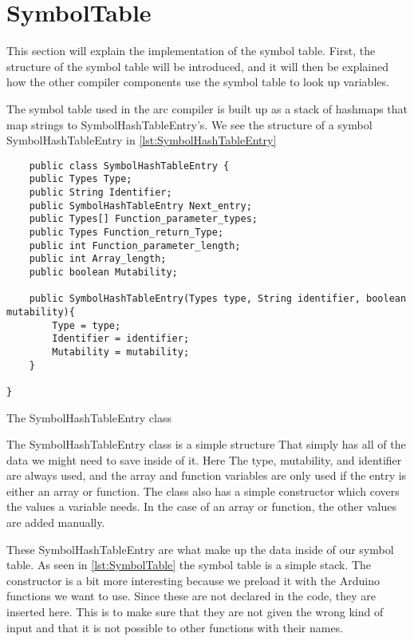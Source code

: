 \section{SymbolTable}

This section will explain the implementation of the symbol table. First, the structure of
the symbol table will be introduced, and it will then be explained how the other
compiler components use the symbol table to look up variables.

The symbol table used in the arc compiler is built up as a stack of hashmaps that map strings to SymbolHashTableEntry's. We see the structure of a symbol SymbolHashTableEntry in \ref{lst:SymbolHashTableEntry}


\begin{listing}[htb!]
    \begin{verbatim}
    public class SymbolHashTableEntry {
    public Types Type;
    public String Identifier;
    public SymbolHashTableEntry Next_entry;
    public Types[] Function_parameter_types;
    public Types Function_return_Type;
    public int Function_parameter_length;
    public int Array_length;
    public boolean Mutability;

    public SymbolHashTableEntry(Types type, String identifier, boolean mutability){
        Type = type;
        Identifier = identifier;
        Mutability = mutability;
    }
    
}
\end{verbatim}
\caption{The SymbolHashTableEntry class}
\label{lst:SymbolHashTableEntry}
\end{listing}

The SymbolHashTableEntry class is a simple structure That simply has all of the data we might need to save inside of it. Here The type, mutability, and identifier are always used, and the array and function variables are only used if the entry is either an array or function. The class also has a simple constructor which covers the values a variable needs. In the case of an array or function, the other values are added manually.


These SymbolHashTableEntry are what make up the data inside of our symbol table. As seen in \ref{lst:SymbolTable} the symbol table is  a simple stack. The constructor is a bit more interesting because we preload it with the Arduino functions we want to use. Since these are not declared in the code, they are inserted here. This is to make sure that they are not given the wrong kind of input and that it is not possible to other functions with their names.

